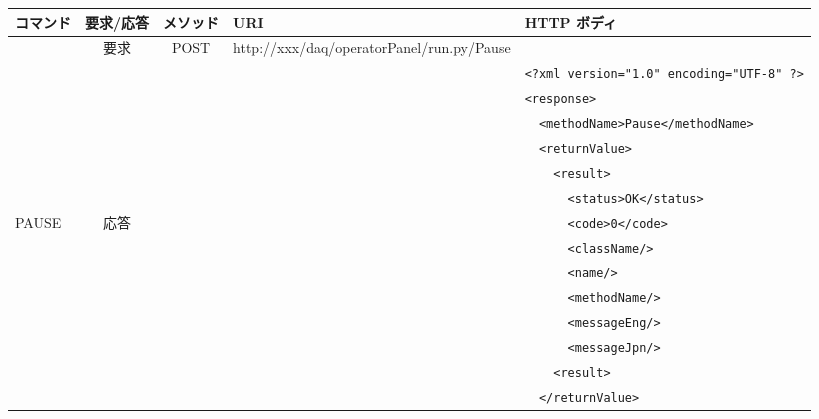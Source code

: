 \documentclass[a4j,10pt,dvips,onecolumn,oneside,final]{jarticle}%
\begin{document}
\begin{table}[htbp]
\begin{center}
{\scriptsize
    \begin{tabular}{|l|c|c|l|l|}\hline
      コマンド    & 要求/応答 & メソッド & URI                      & HTTP ボディ\\ \hline
                  & 要求      & POST & http://xxx/daq/operatorPanel/run.py/Pause  & \\ \cline{2-5}
                  &           &      &                                            & \verb|<?xml version="1.0" encoding="UTF-8" ?>|\\
                  &           &      &                                            & \verb|<response>|\\ 
                  &           &      &                                            & \verb|  <methodName>Pause</methodName>|\\ 
                  &           &      &                                            & \verb|  <returnValue>|\\ 
                  &           &      &                                            & \verb|    <result>|\\ 
                  &           &      &                                            & \verb|      <status>OK</status>|\\ 
    PAUSE         & 応答      &      &                                            & \verb|      <code>0</code>|\\ 
                  &           &      &                                            & \verb|      <className/>|\\ 
                  &           &      &                                            & \verb|      <name/>|\\ 
                  &           &      &                                            & \verb|      <methodName/>|\\ 
                  &           &      &                                            & \verb|      <messageEng/>|\\ 
                  &           &      &                                            & \verb|      <messageJpn/>|\\ 
                  &           &      &                                            & \verb|    <result>|\\
                  &           &      &                                            & \verb|  </returnValue>|\\ 

\end{tabular}}
\end{center}
\end{table}
\end{document}
